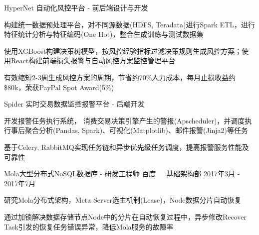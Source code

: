 \documentclass[11pt, a4paper, UTF8]{awesome-cv}
\begin{document}
\begin{cventries}
  \cventry
    {HyperNet 自动化风控平台 - 前后端设计与开发} %
    {} %
    {} %
    {\ } %
    {
      \begin{cvitems} %
        \item {构建统一数据预处理平台，对不同源数据(HDFS, Teradata)进行Spark ETL，进行特征统计分析与特征编码(One Hot)，整合生成训练与测试数据集}
        \item {使用XGBoost构建决策树模型，按风控经验指标过滤决策规则生成风控方案；使用React构建前端损失报警与自动风控方案监控管理平台}
        \item {有效缩短2-3周生成风控方案的周期，节省约70\%人力成本，每月止损收益约\$80k，荣获PayPal Spot Award(5\%)}
      \end{cvitems}
    }

  \cventry
    {Spider 实时交易数据监控报警平台 - 后端开发} %
    {} %
    {} %
    {\ } %
    {
      \begin{cvitems} %
        \item {开发报警任务执行系统， 消费交易决策引擎产生的警报(Apscheduler)，并调度执行事后聚合分析(Pandas, Spark)、可视化(Matplotlib)、邮件报警(Jinja2)等任务}
        \item {基于Celery, RabbitMQ实现任务链和异步优先级任务调度，提高报警服务性能及可靠性}
      \end{cvitems}
    }
    
  \cventry
    {Mola大型分布式NoSQL数据库 - 研发工程师} %
    {百度{\ \cdotp\ \ }基础架构部} %
    {2017年3月 - 2017年7月} %
    {\ } %
    {
      \begin{cvitems} %
        \item {研究Mola分布式架构，Meta Server选主机制(Lease)，Node数据分片自动恢复}
        \item {通过加锁解决数据存储节点Node中的分片在自动恢复过程中，异步修改Recover Task引发的恢复任务错误异常，降低Mola服务的故障率}
      \end{cvitems}
    }


\end{cventries}
\end{document}
